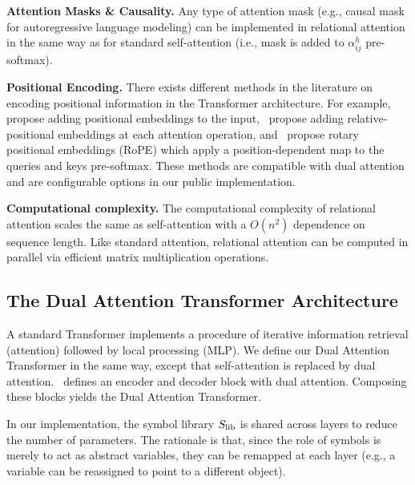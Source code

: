 \textbf{Attention Masks \& Causality.} Any type of attention mask (e.g., causal mask for autoregressive language modeling) can be implemented in relational attention in the same way as for standard self-attention (i.e., mask is added to $\alpha_{ij}^h$ pre-softmax).

\textbf{Positional Encoding.} There exists different methods in the literature on encoding positional information in the Transformer architecture. For example,~\citet{vaswani2017attention} propose adding positional embeddings to the input,~\citet{shawSelfAttentionRelativePosition2018b} propose adding relative-positional embeddings at each attention operation, and~\citet{suRoFormerEnhancedTransformer2023} propose rotary positional embeddings (RoPE) which apply a position-dependent map to the queries and keys pre-softmax. These methods are compatible with dual attention and are configurable options in our public implementation.

\textbf{Computational complexity.} The computational complexity of relational attention scales the same as self-attention with a $O(n^2)$ dependence on sequence length. Like standard attention, relational attention can be computed in parallel via efficient matrix multiplication operations.

\subsection{The Dual Attention Transformer Architecture}

A standard Transformer implements a procedure of iterative information retrieval (attention) followed by local processing (MLP). We define our Dual Attention Transformer in the same way, except that self-attention is replaced by dual attention.~ defines an encoder and decoder block with dual attention. Composing these blocks yields the Dual Attention Transformer.

\begin{remark}
    In our implementation, the symbol library $S_\mathrm{lib}$ is shared across layers to reduce the number of parameters. 
    The rationale is that, since the role of symbols is merely to act as abstract variables, they can be remapped at each layer (e.g., a variable can be reassigned to point to a different object).
\end{remark}

